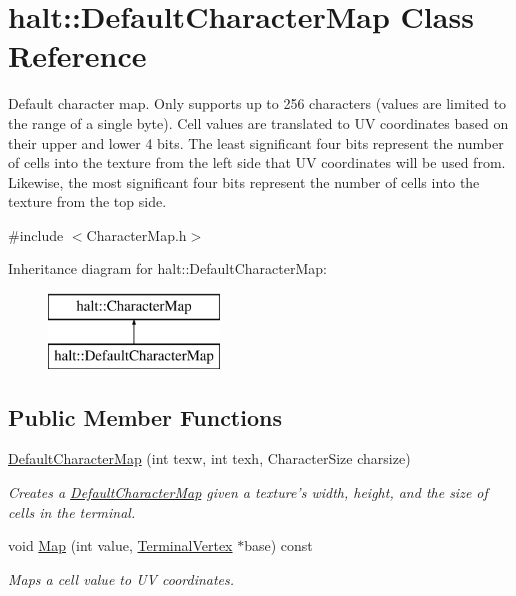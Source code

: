 \hypertarget{classhalt_1_1_default_character_map}{\section{halt\-:\-:\-Default\-Character\-Map \-Class \-Reference}
\label{classhalt_1_1_default_character_map}
}


\-Default character map. \-Only supports up to 256 characters (values are limited to the range of a single byte). \-Cell values are translated to \-U\-V coordinates based on their upper and lower 4 bits. \-The least significant four bits represent the number of cells into the texture from the left side that \-U\-V coordinates will be used from. \-Likewise, the most significant four bits represent the number of cells into the texture from the top side.  




{\ttfamily \#include $<$\-Character\-Map.\-h$>$}

\-Inheritance diagram for halt\-:\-:\-Default\-Character\-Map\-:\begin{figure}[H]
\begin{center}
\leavevmode
\includegraphics[height=2.000000cm]{classhalt_1_1_default_character_map}
\end{center}
\end{figure}
\subsection*{\-Public \-Member \-Functions}
\begin{DoxyCompactItemize}
\item 
\hyperlink{classhalt_1_1_default_character_map_a0d5b0a5026652d4d9d8b0cbe03f2e82b}{\-Default\-Character\-Map} (int texw, int texh, \-Character\-Size charsize)
\begin{DoxyCompactList}\small\item\em \-Creates a \hyperlink{classhalt_1_1_default_character_map}{\-Default\-Character\-Map} given a texture's width, height, and the size of cells in the terminal. \end{DoxyCompactList}\item 
void \hyperlink{classhalt_1_1_default_character_map_a7012d845e8940d35151f181f3e41e7ec}{\-Map} (int value, \hyperlink{structhalt_1_1_terminal_vertex}{\-Terminal\-Vertex} $\ast$base) const 
\begin{DoxyCompactList}\small\item\em \-Maps a cell value to \-U\-V coordinates. \end{DoxyCompactList}\end{DoxyCompactItemize}


